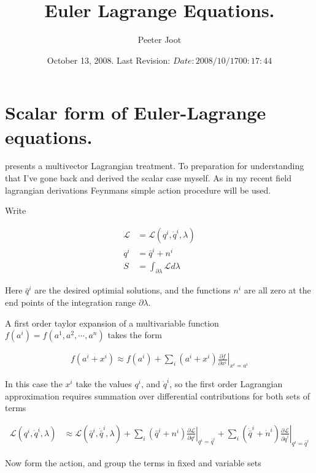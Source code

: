 \documentclass{article}
\title{Euler Lagrange Equations.}
\author{Peeter Joot}
\date{ October 13, 2008.  Last Revision: $Date: 2008/10/17 00:17:44 $ }
\newcommand{\LL}[0]{\mathcal{L}}
\newcommand{\qdot}[0]{\dot{q}}
\newcommand{\ndot}[0]{\dot{n}}
\newcommand{\qbar}[0]{\bar{q}}
\newcommand{\qdotbar}[0]{\dot{\bar{q}}}
\newcommand{\PD}[2]{\frac{\partial {#2}}{\partial {#1}}}
\begin{document}
\maketitle{}

\tableofcontents

\section{Scalar form of Euler-Lagrange equations.}

\cite{lasenby1993mda} presents a multivector Lagrangian treatment.  To
preparation for understanding that I've gone 
back and derived the scalar
case myself.  As in my recent field lagrangian derivations Feynmans
\cite{feynman1963flp} simple action procedure will be used.

Write 

\begin{align*}
\LL &= \LL(q^i, \qdot^i, \lambda) \\
q^i &= \qbar^i + n^i \\
S &= \int_{\partial \lambda} \LL d\lambda
\end{align*}

Here $\qbar^i$ are the desired optimial solutions, and the functions $n^i$
are all zero at the end points of the integration range $\partial \lambda$.

A first order taylor expansion of a multivariable function
$f(a^i) = f(a^1, a^2, \cdots, a^n)$
takes the form

\begin{align*}
f(a^i + x^i) \approx f(a^i) + \sum_i (a^i + x^i) \left. \PD{x^i}{f} \right\vert_{x^i = a^i}
\end{align*}

In this case the $x^i$ take the values $q^i$, and $\qdot^i$, so the first
order Lagrangian approximation requires summation over differential contributions for both sets of terms

\begin{align}\label{eqn:linearizedLagrangian}
\LL(q^i, \qdot^i, \lambda) 
&\approx \LL(\qbar^i, \qdotbar^i, \lambda) 
+ \sum_i (\qbar^i + n^i) \left. \PD{q^i}{\LL} \right\vert_{q^i = \qbar^i}
+ \sum_i (\qdotbar^i + \ndot^i) \left. \PD{\qdot^i}{\LL} \right\vert_{q^i = \qbar^i}
\end{align}

%
Now form the action, and group the terms in fixed and variable sets
\end{document}
